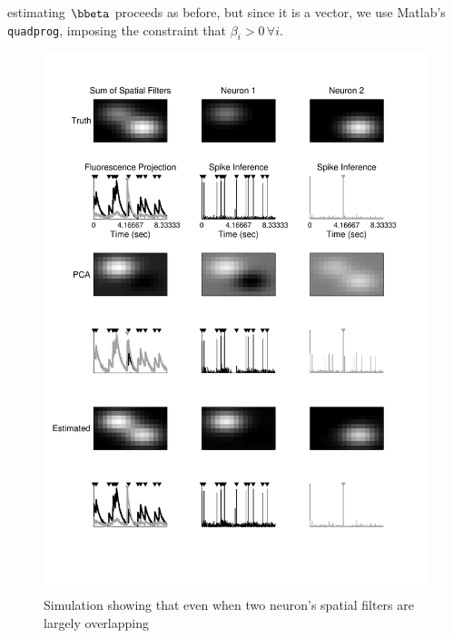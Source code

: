 estimating $\bbeta$ proceeds as before, but since it is a vector, we use Matlab's \texttt{quadprog}, imposing the constraint that $\beta_i>0 \, \forall i$.

\begin{figure}[H]
\centering \includegraphics[width=.9\linewidth]{../figs/spatial_multi}
\caption{Simulation showing that even when two neuron's spatial filters are largely overlapping} \label{fig:spatial_multi}
\end{figure}



